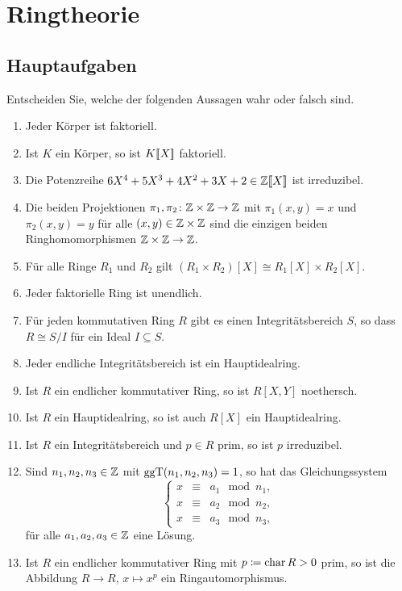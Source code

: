 \section{Ringtheorie}





\subsection{Hauptaufgaben}


\begin{question}[subtitle = Wahr oder Falsch?]
  Entscheiden Sie, welche der folgenden Aussagen wahr oder falsch sind.
  \begin{enumerate}
    \item
      Jeder Körper ist faktoriell.
    \item
      Ist $K$ ein Körper, so ist $K[\![X]\!]$ faktoriell.
    \item
      Die Potenzreihe $6X^4 + 5X^3 + 4X^2 + 3X + 2 \in \mathbb{Z}[\![X]\!]$ ist irreduzibel.
    \item
      Die beiden Projektionen $\pi_1, \pi_2 \colon \mathbb{Z} \times \mathbb{Z} \to \mathbb{Z}$ mit $\pi_1(x,y) = x$ und $\pi_2(x,y) = y$ für alle $(x,y) \in \mathbb{Z} \times \mathbb{Z}$ sind die einzigen beiden Ringhomomorphismen $\mathbb{Z} \times \mathbb{Z} \to \mathbb{Z}$.
    \item
      Für alle Ringe $R_1$ und $R_2$ gilt $(R_1 \times R_2)[X] \cong R_1[X] \times R_2[X]$.
    \item
      Jeder faktorielle Ring ist unendlich.
    \item
      Für jeden kommutativen Ring $R$ gibt es einen Integritätsbereich $S$, so dass $R \cong S/I$ für ein Ideal $I \subseteq S$.
    \item
      Jeder endliche Integritätsbereich ist ein Hauptidealring.
    \item
      Ist $R$ ein endlicher kommutativer Ring, so ist $R[X,Y]$ noethersch.
    \item
      Ist $R$ ein Hauptidealring, so ist auch $R[X]$ ein Hauptidealring.
    \item
      Ist $R$ ein Integritätsbereich und $p \in R$ prim, so ist $p$ irreduzibel.
    \item
      Sind $n_1, n_2, n_3 \in \mathbb{Z}$ mit $\operatorname{ggT}(n_1, n_2, n_3) = 1$, so hat das Gleichungssystem
      \[
        \left\{
          \begin{array}{ccc}
            x &\equiv&  a_1 \mod n_1,
            \\
            x &\equiv&  a_2 \mod n_2,
            \\
            x &\equiv&  a_3 \mod n_3,
          \end{array}
        \right.
      \]
      für alle $a_1, a_2, a_3 \in \mathbb{Z}$ eine Lösung.
    \item
      Ist $R$ ein endlicher kommutativer Ring mit $p \coloneqq \operatorname{char} R > 0$ prim, so ist die Abbildung $R \to R$, $x \mapsto x^p$ ein Ringautomorphismus.
  \end{enumerate}
\end{question}


